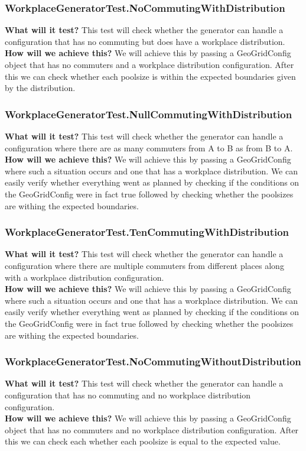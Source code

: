 \documentclass{article}
\begin{document}
\subsubsection{WorkplaceGeneratorTest.NoCommutingWithDistribution}
\textbf{What will it test?}
This test will check whether the generator can handle a configuration that has no commuting but does have a workplace distribution.\\
\newline
\textbf{How will we achieve this?}
We will achieve this by passing a GeoGridConfig object that has no commuters and a workplace distribution configuration. After this we can check whether each poolsize is within the expected boundaries given by the distribution.

\subsubsection{WorkplaceGeneratorTest.NullCommutingWithDistribution}
\textbf{What will it test?}
This test will check whether the generator can handle a configuration where there are as many commuters from A to B as from B to A.\\
\newline
\textbf{How will we achieve this?}
We will achieve this by passing a GeoGridConfig where such a situation occurs and one that has a workplace distribution. We can easily verify whether everything went as planned by checking if the conditions on the GeoGridConfig were in fact true followed by checking whether the poolsizes are withing the expected boundaries.

\subsubsection{WorkplaceGeneratorTest.TenCommutingWithDistribution}
\textbf{What will it test?}
This test will check whether the generator can handle a configuration where there are multiple commuters from different places along with a workplace distribution configuration.\\
\newline
\textbf{How will we achieve this?}
We will achieve this by passing a GeoGridConfig where such a situation occurs and one that has a workplace distribution. We can easily verify whether everything went as planned by checking if the conditions on the GeoGridConfig were in fact true followed by checking whether the poolsizes are withing the expected boundaries.

\subsubsection{WorkplaceGeneratorTest.NoCommutingWithoutDistribution}
\textbf{What will it test?}
This test will check whether the generator can handle a configuration that has no commuting and no workplace distribution configuration.\\
\newline
\textbf{How will we achieve this?}
We will achieve this by passing a GeoGridConfig object that has no commuters and no workplace distribution configuration. After this we can check each whether each poolsize is equal to the expected value.
\end{document}
